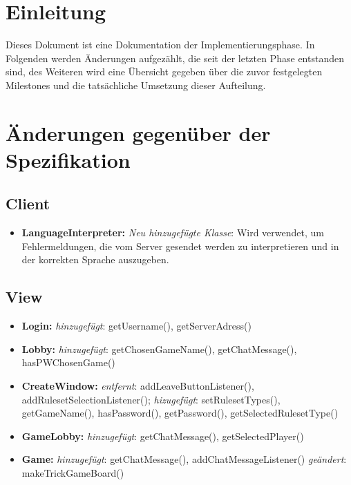 \documentclass{article}
\begin{document}
\tableofcontents
\newpage

\section{Einleitung}
Dieses Dokument ist eine Dokumentation der Implementierungsphase. In Folgenden werden Änderungen aufgezählt, die seit der letzten Phase entstanden sind, des Weiteren wird eine Übersicht gegeben über die zuvor festgelegten Milestones und die tatsächliche Umsetzung dieser Aufteilung.

\section{Änderungen gegenüber der Spezifikation}

\subsection{Client}

\begin{itemize}
\item  \textbf{LanguageInterpreter:}  \textit{Neu hinzugefügte Klasse}: Wird verwendet, um Fehlermeldungen, die vom Server gesendet werden zu interpretieren und in der korrekten Sprache auszugeben.
\end{itemize}

\subsection{View}

\begin{itemize}
\item \textbf{Login:} \textit{hinzugefügt}: getUsername(), getServerAdress()
\item \textbf{Lobby:} \textit{hinzugefügt}: getChosenGameName(), getChatMessage(), hasPWChosenGame()
\item \textbf{CreateWindow:} \textit{entfernt}: addLeaveButtonListener(), addRulesetSelectionListener(); \textit{hizugefügt}: setRulesetTypes(), getGameName(), hasPassword(), getPassword(), getSelectedRulesetType()
\item \textbf{GameLobby:} \textit{hinzugefügt}: getChatMessage(), getSelectedPlayer()
\item \textbf{Game:} \textit{hinzugefügt}: getChatMessage(), addChatMessageListener() \textit{geändert}: makeTrickGameBoard()
\end{itemize}
\end{document}
